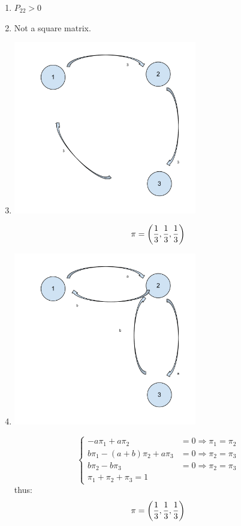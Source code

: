 \documentclass[12pt]{article}
\begin{document}
\begin{enumerate}
\begin{enumerate}
\item $P_{22}>0$
\item Not a square matrix.
\item
\begin{center}
\includegraphics[width=8cm]{Markov_Chains_Ex_4-c.pdf}
\end{center}
$$\pi=\left({1\over3},{1\over3},{1\over3}\right)$$


\item
\begin{center}
\includegraphics[width=8cm]{Markov_Chains_Ex_4-d.pdf}
\end{center}
$$ \begin{cases}
-a\pi_1+a\pi_2&=0\Rightarrow\pi_1=\pi_2\\
b\pi_1-(a+b)\pi_2+a\pi_3&=0\Rightarrow\pi_2=\pi_3\\
b\pi_2-b\pi_3&=0\Rightarrow\pi_2=\pi_3\\
\pi_1+\pi_2+\pi_3=1
\end{cases}
$$
thus:
$$\pi=\left({1\over3},{1\over3},{1\over3}\right)$$


\end{enumerate}
\end{enumerate}
\end{document}
